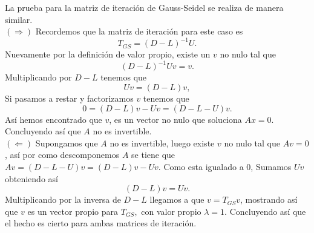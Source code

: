 \begin{sproof}
       La prueba para la matriz de iteración de Gauss-Seidel se realiza de manera similar.\\
       $(\Rightarrow)$ Recordemos que la matriz de iteración para este caso es
       $$T_{GS}=(D-L)^{-1}U.$$
       Nuevamente por la definición de valor propio, existe un $v$ no nulo tal que
       $$(D-L)^{-1}Uv=v.$$
       Multiplicando por $D-L$ tenemos que
       $$Uv=(D-L)v,$$
       Si pasamos a restar y factorizamos $v$ tenemos que
       $$0=(D-L)v-Uv=(D-L-U)v.$$
       Así hemos encontrado que $v$, es un vector no nulo que soluciona $Ax=0.$ Concluyendo así que $A$ no es invertible.\\
       $(\Leftarrow)$ Supongamos que $A$ no es invertible, luego existe $v$ no nulo tal que $Av=0$, así por como descomponemos $A$ se tiene que $Av=(D-L-U)v=(D-L)v-Uv$. Como esta igualado a 0, Sumamos $Uv$ obteniendo así
       $$(D-L)v=Uv.$$
       Multiplicando por la inversa de $D-L$ llegamos a que $v=T_{GS}v$, mostrando así que $v$ es un vector propio para $T_{GS},$ con valor propio $\lambda=1.$ Concluyendo así que el hecho es cierto para ambas matrices de iteración.
       
\end{sproof}